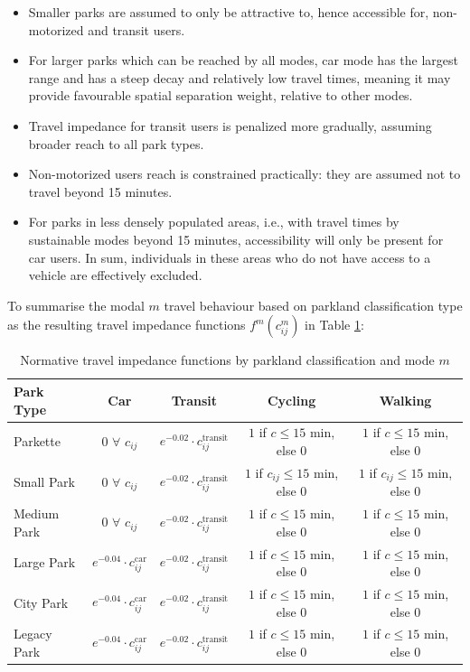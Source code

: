 \documentclass[
11pt, %
oneside, %
english, %
singlespacing, %
]{macthesis} %
\def\tightlist{}
\begin{document}
\begin{itemize}
\tightlist
\item
  Smaller parks are assumed to only be attractive to, hence accessible for, non-motorized and transit users.
\item
  For larger parks which can be reached by all modes, car mode has the largest range and has a steep decay and relatively low travel times, meaning it may provide favourable spatial separation weight, relative to other modes.
\item
  Travel impedance for transit users is penalized more gradually, assuming broader reach to all park types.
\item
  Non-motorized users reach is constrained practically: they are assumed not to travel beyond 15 minutes.
\item
  For parks in less densely populated areas, i.e., with travel times by sustainable modes beyond 15 minutes, accessibility will only be present for car users. In sum, individuals in these areas who do not have access to a vehicle are effectively excluded.
\end{itemize}

To summarise the modal \(m\) travel behaviour based on parkland classification type as the resulting travel impedance functions \(f^m(c^m_{ij})\) in Table \ref{tab:chp3-travel-impedance-by-park-mode}:

\begin{table}[ht]
\centering
\small
\begin{tabular}{|l|c|c|c|c|}
\hline
\textbf{Park Type} & \textbf{Car} & \textbf{Transit} & \textbf{Cycling} & \textbf{Walking} \\
\hline
Parkette &
0 $\forall$ $c_{ij}$ &
$e^{-0.02} \cdot c_{ij}^{\text{transit}}$ &
$1$ if $c \leq 15$ min, else 0 &
$1$ if $c \leq 15$ min, else 0 \\
\hline
Small Park &
0 $\forall$ $c_{ij}$ &
$e^{-0.02} \cdot c_{ij}^{\text{transit}}$ &
$1$ if $c_{ij} \leq 15$ min, else 0 &
$1$ if $c_{ij} \leq 15$ min, else 0 \\
\hline
Medium Park &
0 $\forall$ $c_{ij}$ &
$e^{-0.02} \cdot c_{ij}^{\text{transit}}$ &
$1$ if $c \leq 15$ min, else 0 &
$1$ if $c \leq 15$ min, else 0 \\
\hline
Large Park &
$e^{-0.04} \cdot c_{ij}^{\text{car}}$ &
$e^{-0.02} \cdot c_{ij}^{\text{transit}}$ &
$1$ if $c \leq 15$ min, else 0 &
$1$ if $c \leq 15$ min, else 0 \\
\hline
City Park &
$e^{-0.04} \cdot c_{ij}^{\text{car}}$ &
$e^{-0.02} \cdot c_{ij}^{\text{transit}}$ &
$1$ if $c \leq 15$ min, else 0 &
$1$ if $c \leq 15$ min, else 0 \\
\hline
Legacy Park &
$e^{-0.04} \cdot c_{ij}^{\text{car}}$ &
$e^{-0.02} \cdot c_{ij}^{\text{transit}}$ &
$1$ if $c \leq 15$ min, else 0 &
$1$ if $c \leq 15$ min, else 0 \\
\hline
\end{tabular}
\caption{Normative travel impedance functions by parkland classification and mode $m$}
\label{tab:chp3-travel-impedance-by-park-mode}
\end{table}
\end{document}
